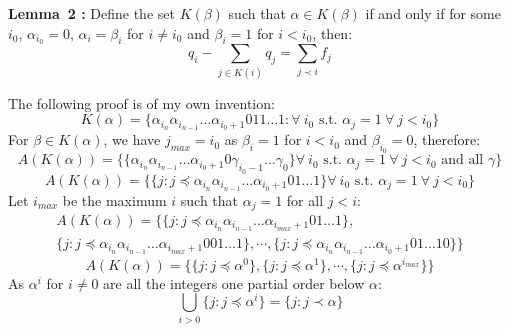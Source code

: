 \documentclass[twoside]{article}
\begin{document}
\vspace*{12pt}
\noindent
{\bf Lemma~2 \cite{bravyikitaev}:} Define the set $K(\beta)$ such that $\alpha \in K(\beta)$ if and only if for some $i_0$, $\alpha_{i_0} = 0$, $\alpha_i = \beta_i$ for $i\neq i_0$ and $\beta_i = 1$ for $i< i_0$, then:
\begin{equation}
        q_i - \sum_{j \in K(i)} q_j = \sum_{j \prec i} f_j
\end{equation}
\vspace*{12pt}

\noindent
The following proof is of my own invention:
\begin{equation}
        K(\alpha) = \{ \alpha_{i_n} \alpha_{i_{n-1}} \ldots \alpha_{i_0 +1} 0 11 \ldots 1: \forall \>i_0\text{ s.t. } \alpha_{j} = 1 \> \forall \>j<i_0\}
\end{equation}
For $\beta \in K(\alpha)$, we have $j_{max} = i_0$ as $\beta_i = 1$ for $i<i_0$ and $\beta_{i_0} = 0$, therefore:
\begin{equation}
        A(K(\alpha)) = \{\{  \alpha_{i_n} \alpha_{i_{n-1}} \ldots \alpha_{i_0+1}0 \gamma_{i_0 -1} \ldots \gamma_{0} \} \forall \>i_0\text{ s.t. } \alpha_{j} = 1 \> \forall \>j<i_0\text{ and all } \gamma\}
\end{equation}
\begin{equation}
        \label{AK}
A(K(\alpha)) =  \{\{  j: j \preceq \alpha_{i_n} \alpha_{i_{n-1}} \ldots \alpha_{i_0+1}0 1 \ldots 1 \}\forall \>i_0\text{ s.t. } \alpha_{j} = 1 \> \forall \>j<i_0\}
\end{equation}
Let $i_{max}$ be the maximum $i$ such that $\alpha_j =1$ for all $j < i$:
\begin{multline}
        A(K(\alpha)) =  \{\{  j: j \preceq \alpha_{i_n} \alpha_{i_{n-1}} \ldots \alpha_{i_{max}+1}0 1 \ldots 1 \},\\ \{  j: j \preceq \alpha_{i_n} \alpha_{i_{n-1}} \ldots \alpha_{i_{max}+1}00 1 \ldots 1 \}, \cdots, \{  j: j \preceq \alpha_{i_n} \alpha_{i_{n-1}} \ldots \alpha_{i_0+1}0 1 \ldots 10 \} \} \end{multline}
        \begin{equation}
                A(K(\alpha)) = \{ \{ j: j \preceq \alpha^0 \}, \{ j: j \preceq \alpha^1 \}, \cdots, \{ j: j \preceq \alpha^{i_{max}} \} \}
        \end{equation}
        As $\alpha^i$ for $i\neq 0$ are all the integers one partial order below $\alpha$:
        \begin{equation}\bigcup_{i>0} \{j: j \preceq \alpha^i\} = \{j: j \prec \alpha\}\end{equation}
\end{document}
